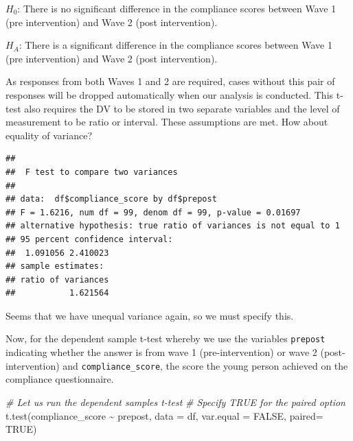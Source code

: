 \documentclass[
]{book}
\newenvironment{Shaded}{\begin{snugshade}}{\end{snugshade}}
\newcommand{\AttributeTok}[1]{\textcolor[rgb]{0.77,0.63,0.00}{#1}}
\newcommand{\CommentTok}[1]{\textcolor[rgb]{0.56,0.35,0.01}{\textit{#1}}}
\newcommand{\ConstantTok}[1]{\textcolor[rgb]{0.00,0.00,0.00}{#1}}
\newcommand{\FunctionTok}[1]{\textcolor[rgb]{0.00,0.00,0.00}{#1}}
\newcommand{\NormalTok}[1]{#1}
\newcommand{\SpecialCharTok}[1]{\textcolor[rgb]{0.00,0.00,0.00}{#1}}
\begin{document}
\(H_0\): There is no significant difference in the compliance scores between Wave 1 (pre intervention) and Wave 2 (post intervention).

\(H_A\): There is a significant difference in the compliance scores between Wave 1 (pre intervention) and Wave 2 (post intervention).

As responses from both Waves 1 and 2 are required, cases without this pair of responses will be dropped automatically when our analysis is conducted. This t-test also requires the DV to be stored in two separate variables and the level of measurement to be ratio or interval. These assumptions are met. How about equality of variance?

\begin{Shaded}
\end{Shaded}

\begin{verbatim}
## 
##  F test to compare two variances
## 
## data:  df$compliance_score by df$prepost
## F = 1.6216, num df = 99, denom df = 99, p-value = 0.01697
## alternative hypothesis: true ratio of variances is not equal to 1
## 95 percent confidence interval:
##  1.091056 2.410023
## sample estimates:
## ratio of variances 
##           1.621564
\end{verbatim}

Seems that we have unequal variance again, so we must specify this.

Now, for the dependent sample t-test whereby we use the variables \texttt{prepost} indicating whether the answer is from wave 1 (pre-intervention) or wave 2 (post-intervention) and \texttt{compliance\_score}, the score the young person achieved on the compliance questionnaire.

\begin{Shaded}
\begin{Highlighting}[]
\CommentTok{\# Let us run the dependent samples t{-}test }
\CommentTok{\# Specify TRUE for the paired option }
\FunctionTok{t.test}\NormalTok{(compliance\_score }\SpecialCharTok{\textasciitilde{}}\NormalTok{ prepost, }\AttributeTok{data =}\NormalTok{ df, }\AttributeTok{var.equal =} \ConstantTok{FALSE}\NormalTok{, }\AttributeTok{paired=} \ConstantTok{TRUE}\NormalTok{)}
\end{Highlighting}
\end{Shaded}
\end{document}
